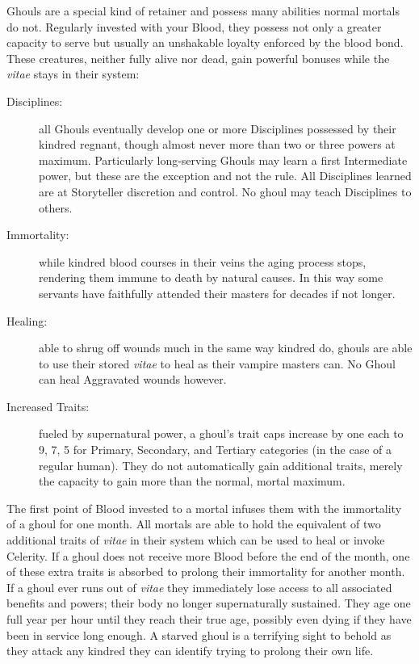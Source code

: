 Ghouls are a special kind of retainer and possess many abilities normal mortals do not.  
Regularly invested with your Blood, they possess not only a greater capacity to serve but usually 
an unshakable loyalty enforced by the blood bond.  These creatures, neither fully alive nor dead, 
gain powerful bonuses while the \emph{vitae} stays in their system: \\

\begin{description}
	\item[Disciplines:]  all Ghouls eventually develop one or more Disciplines possessed by their 
	kindred regnant, though almost never more than two or three powers at maximum.  Particularly 
	long-serving Ghouls may learn a first Intermediate power, but these are the exception and not 
	the rule.  All Disciplines learned are at Storyteller discretion and control.  No ghoul may 
	teach Disciplines to others.
	\item[Immortality:]  while kindred blood courses in their veins the aging process stops, 
	rendering them immune to death by natural causes.  In this way some servants have 
	faithfully attended their masters for decades if not longer.
	\item[Healing:]  able to shrug off wounds much in the same way kindred do, ghouls 
	are able to use their stored \emph{vitae} to heal as their vampire masters can.  No Ghoul 
	can heal Aggravated wounds however.
	\item[Increased Traits:]  fueled by supernatural power, a ghoul's trait caps increase by 
	one each to 9, 7, 5 for Primary, Secondary, and Tertiary categories (in the case of a regular 
	human).  They do not automatically gain additional traits, merely the capacity to gain more 
	than the normal, mortal maximum. \\
\end{description}

\noindent The first point of Blood invested to a mortal infuses them with the immortality of a 
ghoul for one month.  All mortals are able to hold the equivalent of two additional traits of 
\emph{vitae} in their system which can be used to heal or invoke Celerity.  If a ghoul does not 
receive more Blood before the end of the month, one of these extra traits is absorbed to prolong 
their immortality for another month.  If a ghoul ever runs out of \emph{vitae} they immediately 
lose access to all associated benefits and powers; their body no longer supernaturally sustained.  
They age one full year per hour until they reach their true age, possibly even dying if they have 
been in service long enough.  A starved ghoul is a terrifying sight to behold as they attack any 
kindred they can identify trying to prolong their own life.

